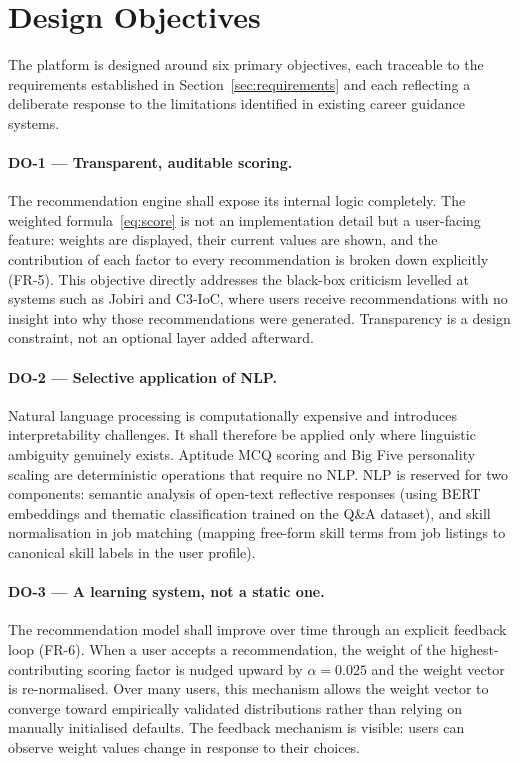 \section{Design Objectives}
\label{sec:design-objectives}

The platform is designed around six primary objectives, each traceable to the
requirements established in Section~\ref{sec:requirements} and each reflecting
a deliberate response to the limitations identified in existing career guidance
systems.

\paragraph{DO-1 --- Transparent, auditable scoring.}
The recommendation engine shall expose its internal logic completely. The
weighted formula~\eqref{eq:score} is not an implementation detail but a
user-facing feature: weights are displayed, their current values are shown, and
the contribution of each factor to every recommendation is broken down
explicitly (FR-5). This objective directly addresses the black-box criticism
levelled at systems such as Jobiri and C3-IoC, where users receive
recommendations with no insight into why those recommendations were generated.
Transparency is a design constraint, not an optional layer added afterward.

\paragraph{DO-2 --- Selective application of NLP.}
Natural language processing is computationally expensive and introduces
interpretability challenges. It shall therefore be applied only where linguistic
ambiguity genuinely exists. Aptitude MCQ scoring and Big Five personality
scaling are deterministic operations that require no NLP. NLP is reserved for
two components: semantic analysis of open-text reflective responses (using BERT
embeddings and thematic classification trained on the Q\&A dataset), and skill
normalisation in job matching (mapping free-form skill terms from job listings
to canonical skill labels in the user profile).

\paragraph{DO-3 --- A learning system, not a static one.}
The recommendation model shall improve over time through an explicit feedback
loop (FR-6). When a user accepts a recommendation, the weight of the
highest-contributing scoring factor is nudged upward by $\alpha = 0.025$ and
the weight vector is re-normalised. Over many users, this mechanism allows the
weight vector to converge toward empirically validated distributions rather than
relying on manually initialised defaults. The feedback mechanism is visible:
users can observe weight values change in response to their choices.

